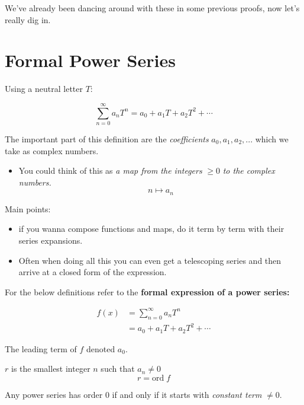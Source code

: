 We've already been dancing around with these in some previous proofs, now let's really dig in. 
\section{Formal Power Series}
\begin{defn}
  Using a neutral letter $T$:

  \[\sum_{n = 0}^{\infty}a_n T^n = a_0 + a_1 T + a_2 T^2 + \cdots \]

\end{defn}
The important part of this definition are the \textit{coefficients} $a_0, a_1, a_2, ...$ which we 
take as complex numbers.
\begin{itemize}
  \item You could think of this as \textit{a map from the integers} $ \geq 0 $ \textit{to the complex numbers.}
  \[n \mapsto a_n \]
\end{itemize}

Main points: 
  \begin{itemize}
    \item if you wanna compose functions and maps, do it term by term with their series expansions.
    \item Often when doing all this you can even get a telescoping series and then arrive at a closed form of the expression. 
  \end{itemize}

For the below definitions refer to the \textbf{formal expression of a power series:}

\begin{align*}
  f(x) &= \sum_{n = 0}^{\infty} a_n T^n \\
  &= a_0 + a_1 T + a_2 T^2 + \cdots
\end{align*}

\begin{defn}
  The leading term of $f$ denoted $a_0$.
\end{defn}

\begin{defn}
  $r$ is the smallest integer $n$ such that $a_n \not = 0$
  \[r = \text{ord}\; f\]
\end{defn}

\begin{thm}
  Any power series has order $0$ if and only if it starts with \textit{constant term} $\not = 0.$
\end{thm}

